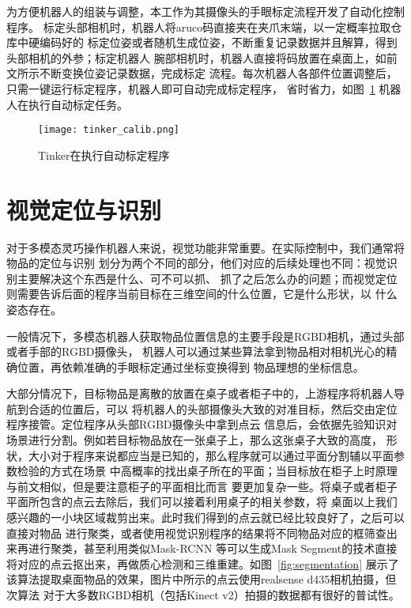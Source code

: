 为方便机器人的组装与调整，本工作为其摄像头的手眼标定流程开发了自动化控制程序。
标定头部相机时，机器人将aruco码直接夹在夹爪末端，以一定概率拉取仓库中硬编码好的
标定位姿或者随机生成位姿，不断重复记录数据并且解算，得到头部相机的外参；标定机器人
腕部相机时，机器人直接将码放置在桌面上，如前文所示不断变换位姿记录数据，完成标定
流程。每次机器人各部件位置调整后，只需一键运行标定程序，机器人即可自动完成标定程序，
省时省力，如图~\ref{fig:tinker_calib} 机器人在执行自动标定任务。

\begin{figure}[ht] %
  \centering
  \texttt{[image: tinker\_calib.png]}
  \caption{Tinker在执行自动标定程序}
  \label{fig:tinker_calib}
\end{figure}


\section{视觉定位与识别}

对于多模态灵巧操作机器人来说，视觉功能非常重要。在实际控制中，我们通常将物品的定位与识别
划分为两个不同的部分，他们对应的后续处理也不同：视觉识别主要解决这个东西是什么、可不可以抓、
抓了之后怎么办的问题；而视觉定位则需要告诉后面的程序当前目标在三维空间的什么位置，它是什么形状，以
什么姿态存在。

一般情况下，多模态机器人获取物品位置信息的主要手段是RGBD相机，通过头部或者手部的RGBD摄像头，
机器人可以通过某些算法拿到物品相对相机光心的精确位置，再依赖准确的手眼标定通过坐标变换得到
物品理想的坐标信息。

大部分情况下，目标物品是离散的放置在桌子或者柜子中的，上游程序将机器人导航到合适的位置后，可以
将机器人的头部摄像头大致的对准目标，然后交由定位程序接管。定位程序从头部RGBD摄像头中拿到点云
信息后，会依据先验知识对场景进行分割。例如若目标物品放在一张桌子上，那么这张桌子大致的高度，
形状，大小对于程序来说都应当是已知的，那么程序就可以通过平面分割辅以平面参数检验的方式在场景
中高概率的找出桌子所在的平面；当目标放在柜子上时原理与前文相似，但是要注意柜子的平面相比而言
要更加复杂一些。将桌子或者柜子平面所包含的点云去除后，我们可以接着利用桌子的相关参数，将
桌面以上我们感兴趣的一小块区域裁剪出来。此时我们得到的点云就已经比较良好了，之后可以直接对物品
进行聚类，或者使用视觉识别程序的结果将不同物品对应的框筛查出来再进行聚类，甚至利用类似Mask-RCNN
等可以生成Mask Segment的技术直接将对应的点云抠出来，再做质心检测和三维重建。如图~\ref{fig:segmentation}
展示了该算法提取桌面物品的效果，图片中所示的点云使用realsense d435相机拍摄，但次算法
对于大多数RGBD相机（包括Kinect v2）拍摄的数据都有很好的普试性。

